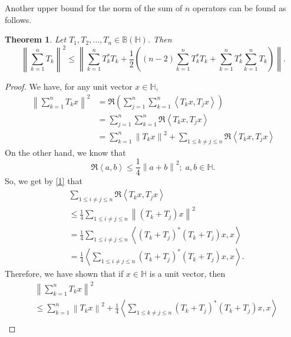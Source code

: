 \documentclass[12pt,twoside,reqno]{amsart}
\newtheorem{theorem}{Theorem}[section]
\numberwithin{equation}{section}
\begin{document}
Another upper bound for the norm of the sum of $n$ operators can be found as follows.
\begin{theorem}\label{3}
Let ${{T}_{1}},{{T}_{2}},\ldots ,{{T}_{n}}\in \mathbb B\left( \mathbb H \right)$. Then 
\[{{\left\| \sum\limits_{k=1}^{n}{{{T}_{k}}} \right\|}^{2}}\le \left\| \sum\limits_{k=1}^{n}{T_{k}^{*}{{T}_{k}}}+\frac{1}{2}\left( \left( n-2 \right)\sum\limits_{k=1}^{n}{T_{k}^{*}{{T}_{k}}}+\sum\limits_{k=1}^{n}{T_{k}^{*}}\sum\limits_{k=1}^{n}{{{T}_{k}}} \right) \right\|.\]
\end{theorem}
\begin{proof}
We have, for any unit vector $x\in \mathbb H$,
\begin{equation}\label{1}
\begin{aligned}
   {{\left\| \sum\limits_{k=1}^{n}{{{T}_{k}}}x \right\|}^{2}}&=\Re\left( \sum\limits_{j=1}^{n}{\sum\limits_{k=1}^{n}{\left\langle {{T}_{k}}x,{{T}_{j}}x \right\rangle }} \right) \\ 
 & =\sum\limits_{j=1}^{n}{\sum\limits_{k=1}^{n}{\Re\left\langle {{T}_{k}}x,{{T}_{j}}x \right\rangle }} \\ 
 & =\sum\limits_{k=1}^{n}{{{\left\| {{T}_{k}}x \right\|}^{2}}}+\sum\limits_{1\le k\ne j\le n}{\Re\left\langle {{T}_{k}}x,{{T}_{j}}x \right\rangle }  
\end{aligned}
\end{equation}
On the other hand, we know that
	\[\Re\left\langle a,b \right\rangle \le \frac{1}{4}{{\left\| a+b \right\|}^{2}};\;a,b\in \mathbb H.\]
So, we get by \eqref{1} that
	\[\begin{aligned}
  & \sum\limits_{1\le i\ne j\le n}{\Re\left\langle {{T}_{k}}x,{{T}_{j}}x \right\rangle } \\ 
 & \le \frac{1}{4}\sum\limits_{1\le i\ne j\le n}{{{\left\| \left( {{T}_{k}}+{{T}_{j}} \right)x \right\|}^{2}}} \\ 
 & =\frac{1}{4}\sum\limits_{1\le i\ne j\le n}{\left\langle {{\left( {{T}_{k}}+{{T}_{j}} \right)}^{*}}\left( {{T}_{k}}+{{T}_{j}} \right)x,x \right\rangle } \\ 
 & =\frac{1}{4}\left\langle \sum\limits_{1\le i\ne j\le n}{{{\left( {{T}_{k}}+{{T}_{j}} \right)}^{*}}\left( {{T}_{k}}+{{T}_{j}} \right)}x,x \right\rangle .  
\end{aligned}\]
Therefore, we have shown that if $x\in\mathbb{H}$ is a unit vector, then
	\[\begin{aligned}
  & {{\left\| \sum\limits_{k=1}^{n}{{{T}_{k}}}x \right\|}^{2}} \\ 
 & \le \sum\limits_{k=1}^{n}{{{\left\| {{T}_{k}}x \right\|}^{2}}}+\frac{1}{4}\left\langle \sum\limits_{1\le k\ne j\le n}{{{\left( {{T}_{k}}+{{T}_{j}} \right)}^{*}}\left( {{T}_{k}}+{{T}_{j}} \right)}x,x \right\rangle  \\ 

\end{aligned}\]
\end{proof}
\end{document}
